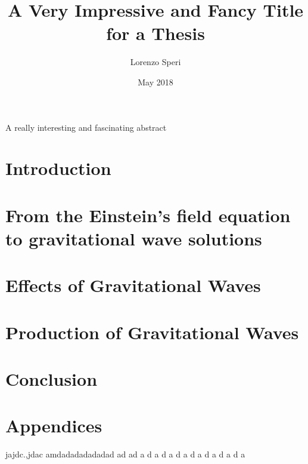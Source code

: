 \documentclass[twoside,english, a4paper, 12pt]{shared/uiofysmaster}
\author{Lorenzo Speri}
\title{\bf{A Very Impressive and Fancy Title for a Thesis}}
\date{May 2018}
\begin{document}

\maketitle
\clearpage

\tableofcontents
\clearpage

\begin{abstract1}
A really interesting and fascinating abstract
\end{abstract1}

\clearpage
\section{Introduction}


\clearpage
\section{From the Einstein's field equation\\ to gravitational wave solutions}


\clearpage
\section{Effects of Gravitational Waves}


\clearpage
\section{Production of Gravitational Waves}


\clearpage
\section{Conclusion}

\clearpage
\section{Appendices}

jajdc.,jdac amdadadadadadad ad ad a  d a d a d a d a  d a d a d a





\end{document}
